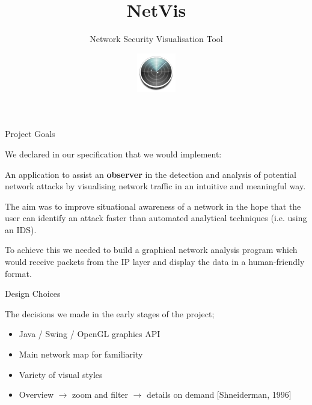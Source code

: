 \documentclass{beamer}
\begin{document}
    \title{NetVis}
    \subtitle{Network Security Visualisation Tool}
    \date{}

    \author{\includegraphics[width=64px,height=64px]{img/netvis.png}}

    \begin{frame}
        \titlepage
    \end{frame}

    \begin{frame}{Project Goals}

        We declared in our specification that we would implement:\\ \bigskip

        An application to assist an \textbf{observer} in the detection and
        analysis of potential network attacks by visualising network traffic in
        an intuitive and meaningful way.\\ \bigskip

        The aim was to improve situational awareness of a network in the hope
        that the user can identify an attack faster than automated analytical
        techniques (i.e. using an IDS).\\ \bigskip

        To achieve this we needed to build a graphical network analysis program
        which would receive packets from the IP layer and display the data in a 
        human-friendly format.

    \end{frame}

    \begin{frame}{Design Choices}

        The decisions we made in the early stages of the project;

        \begin{itemize}
            \item{Java / Swing / OpenGL graphics API}
            \item{Main network map for familiarity}
            \item{Variety of visual styles}
            \item{Overview $\rightarrow$ zoom and filter $\rightarrow$ details
            on demand} [Shneiderman, 1996]
        \end{itemize} \bigskip \bigskip

    \end{frame}
\end{document}
